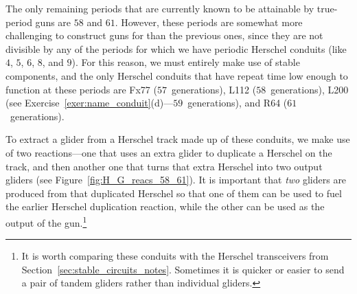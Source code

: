 The only remaining periods that are currently known to be attainable by true-period guns are $58$ and $61$. However, these periods are somewhat more challenging to construct guns for than the previous ones, since they are not divisible by any of the periods for which we have periodic Herschel conduits (like $4$, $5$, $6$, $8$, and $9$). For this reason, we must entirely make use of stable components, and the only Herschel conduits that have repeat time low enough to function at these periods are Fx77 ($57$~generations), L112 ($58$~generations), L200 (see Exercise~\ref{exer:name_conduit}(d)---$59$~generations), and R64 ($61$~generations).

To extract a glider from a Herschel track made up of these conduits, we make use of two reactions---one that uses an extra glider to duplicate a Herschel on the track, and then another one that turns that extra Herschel into two output gliders (see Figure~\ref{fig:H_G_reacs_58_61}). It is important that \emph{two} gliders are produced from that duplicated Herschel so that one of them can be used to fuel the earlier Herschel duplication reaction, while the other can be used as the output of the gun.\footnote{It is worth comparing these conduits with the Herschel transceivers from Section~\ref{sec:stable_circuits_notes}. Sometimes it is quicker or easier to send a pair of tandem gliders rather than individual gliders.}

